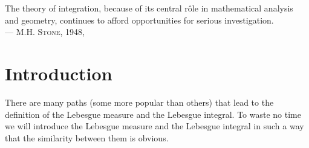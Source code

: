 \documentclass[main.tex]{subfiles}
\begin{document}
\begin{flushright}
\begin{minipage}{.7\columnwidth}
\begin{flushright}
The theory of integration,
because of its 
central r\^ole 
in mathematical analysis and geometry,
continues to afford opportunities 
for serious investigation.\\
--- \textsc{M.H. Stone}, 1948, \cite{Stone48}
\end{flushright}
\end{minipage}
\end{flushright}

\section{Introduction}
\noindent
There are many paths (some more popular than
others) that lead to the definition of the Lebesgue measure
and the Lebesgue integral.
To waste no time we will introduce the Lebesgue measure
and the Lebesgue integral
in such a way that the similarity between them is obvious.
\end{document}
